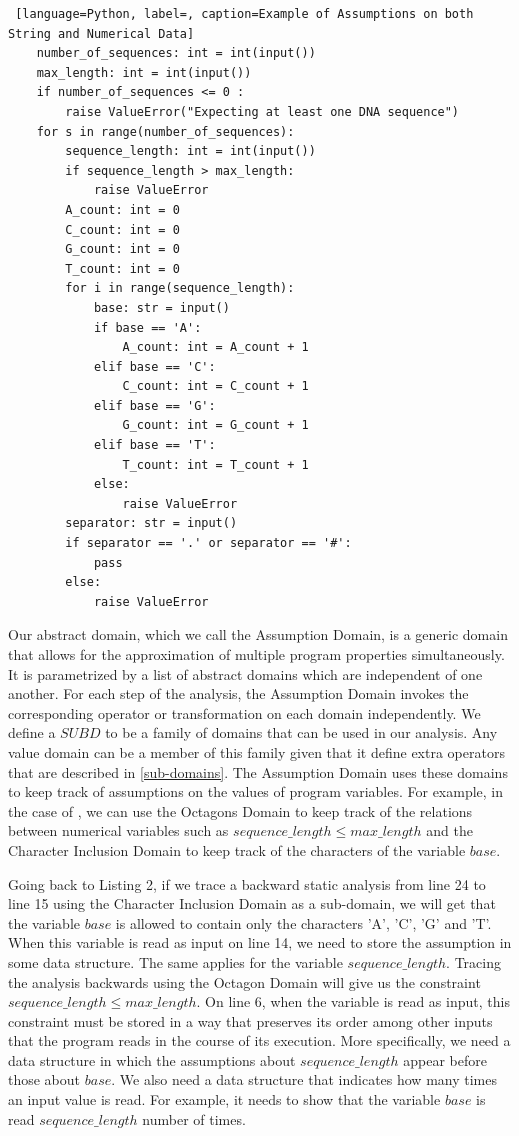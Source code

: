 \documentclass[10pt]{report}
\begin{document}
\begin{lstlisting} [language=Python, label=, caption=Example of Assumptions on both String and Numerical Data]
	number_of_sequences: int = int(input())
	max_length: int = int(input())
	if number_of_sequences <= 0 :
		raise ValueError("Expecting at least one DNA sequence")
	for s in range(number_of_sequences):
		sequence_length: int = int(input())
		if sequence_length > max_length:
			raise ValueError
		A_count: int = 0
		C_count: int = 0
		G_count: int = 0
		T_count: int = 0
		for i in range(sequence_length):
			base: str = input()
			if base == 'A':
				A_count: int = A_count + 1
			elif base == 'C':
				C_count: int = C_count + 1
			elif base == 'G':
				G_count: int = G_count + 1
			elif base == 'T':
				T_count: int = T_count + 1
			else:
				raise ValueError
		separator: str = input()
		if separator == '.' or separator == '#':
			pass
		else:
			raise ValueError
\end{lstlisting}



Our abstract domain, which we call the Assumption Domain, is a generic domain that allows for the approximation of multiple program properties simultaneously. It is parametrized by a list of abstract domains which are independent of one another. For each step of the analysis, the Assumption Domain invokes the corresponding operator or transformation on each domain independently. We define a $ SUBD $ to be a family of domains that can be used in our analysis. Any value domain can be a member of this family given that it define extra operators that are described in \ref{sub-domains}. The Assumption Domain uses these domains to keep track of assumptions on the values of program variables. For example, in the case of , we can use the Octagons Domain \cite{octagon} to keep track of the relations between numerical variables such as $sequence\_length \leq max\_length$ and the Character Inclusion Domain \cite{character} to keep track of the characters of the variable $base$.

Going back to Listing 2, if we trace a backward static analysis from line 24 to line 15 using the Character Inclusion Domain as a sub-domain, we will get that the variable $ base $ is allowed to contain only the characters 'A', 'C', 'G' and 'T'. When this variable is read as input on line 14, we need to store the assumption in some data structure. The same applies for the variable $ sequence\_length $. Tracing the analysis backwards using the Octagon Domain will give us the constraint $ sequence\_length \leq max\_length $. On line 6, when the variable is read as input, this constraint must be stored in a way that preserves its order among other inputs that the program reads in the course of its execution. More specifically, we need a data structure in which the assumptions about $ sequence\_length$ appear before those about $ base $.  We also need a data structure that indicates how many times an input value is read. For example, it needs to show that the variable $ base $ is read $ sequence\_length $ number of times. 
\end{document}
